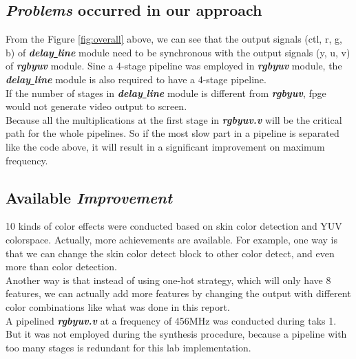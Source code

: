 \documentclass[12pt,fleqn]{article}
\begin{document}
\subsection{\emph{Problems} occurred in our approach}
From the Figure \ref{fig:overall} above, we can see that the output signals (ctl, r, g, b) of \textbf{\emph{delay\underline{ }line}} module need to be synchronous with the output signals (y, u, v) of \textbf{\emph{rgbyuv}} module. Sine a 4-stage pipeline was employed in \textbf{\emph{rgbyuv}} module, the \textbf{\emph{delay\underline{ }line}} module is also required to have a 4-stage pipeline.\\
If the number of stages in \textbf{\emph{delay\underline{ }line}} module is different from \textbf{\emph{rgbyuv}}, fpge would not generate video output to screen.\\
Because all the multiplications at the first stage in \textbf{\emph{rgbyuv.v}} will be the critical path for the whole pipelines. So if the most slow part in a pipeline is separated like the code above, it will result in a significant improvement on maximum frequency.\\
\subsection{Available \emph{Improvement}}
10 kinds of color effects were conducted based on skin color detection and YUV colorspace. Actually, more achievements are available. For example, one way is that we can change the skin color detect block to other color detect, and even more than color detection.\\
 Another way is that instead of using one-hot strategy, which will only have 8 features, we can actually add more features by changing the output with different color combinations like what was done in this report.\\
A pipelined \textbf{\emph{rgbyuv.v}} at a frequency of 456MHz was conducted during taks 1. But it was not employed during the synthesis procedure, because a pipeline with too many stages is redundant for this lab implementation.\\
\newpage
\end{document}
